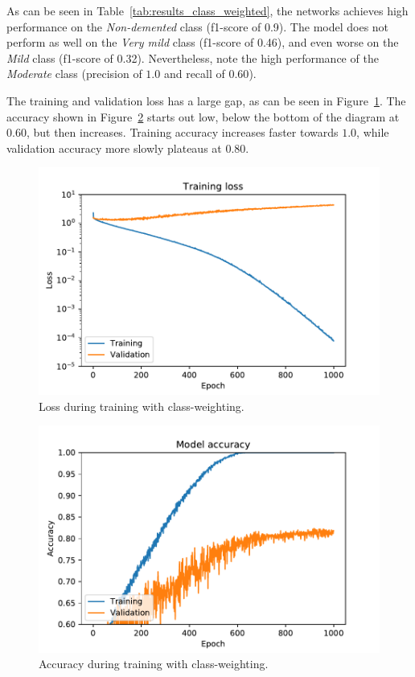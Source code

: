 \documentclass{kththesis}
\begin{document}
As can be seen in Table~\ref{tab:results_class_weighted}, the networks achieves high performance on the \textit{Non-demented} class (f1-score of 0.9). The model does not perform as well on the \textit{Very mild} class (f1-score of 0.46), and even worse on the \textit{Mild} class (f1-score of 0.32). Nevertheless, note the high performance of the \textit{Moderate} class (precision of $1.0$ and recall of $0.60$).

The training and validation loss has a large gap, as can be seen in Figure~\ref{fig:loss_class_weighting}. The accuracy shown in Figure~\ref{fig:accuracy_class_weighting} starts out low, below the bottom of the diagram at $0.60$, but then increases. Training accuracy increases faster towards $1.0$, while validation accuracy more slowly plateaus at $0.80$.

\begin{figure}[H]
  \centering
  \includegraphics[width=0.9\linewidth]{img/loss_class_weighted.pdf}
  \caption{Loss during training with class-weighting.} \label{fig:loss_class_weighting}
\end{figure}
\begin{figure}[H]
  \centering
  \includegraphics[width=0.9\linewidth]{img/accuracy_class_weighted.pdf}
  \caption{Accuracy during training with class-weighting.} \label{fig:accuracy_class_weighting}
\end{figure}
\end{document}
